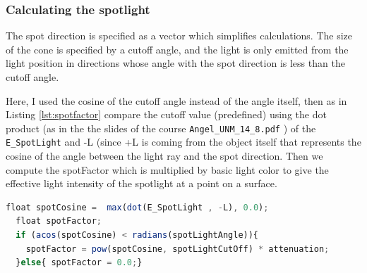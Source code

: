 \documentclass[12pt,a4paper]{article}
\begin{document}
\subsubsection{Calculating the spotlight}
 The spot direction is specified as a vector which simplifies calculations. The size of the cone is specified by a cutoff angle, and the light is only emitted from the light position in directions whose angle with the spot direction is less than the cutoff angle. 
 
 Here, I used  the cosine of the cutoff angle instead of the angle itself, then as in Listing \ref{lst:spotfactor} compare the cutoff value (predefined) using the dot product (as in the the slides of the course \texttt{Angel\_UNM\_14\_8.pdf} ) of the \texttt{E\_SpotLight} and -L (since +L is coming from the object itself that represents the cosine of the angle between the light ray and the spot direction. Then we compute the spotFactor which is multiplied by basic light color to give the effective light intensity of the spotlight at a point on a surface.
 
 \begin{lstlisting}[caption={Spotfactor assignment},label={lst:spotfactor},language=JavaScript]
  float spotCosine =  max(dot(E_SpotLight , -L), 0.0);
  float spotFactor;
  if (acos(spotCosine) < radians(spotLightAngle)){
    spotFactor = pow(spotCosine, spotLightCutOff) * attenuation;
  }else{ spotFactor = 0.0;}
\end{lstlisting}
\end{document}
